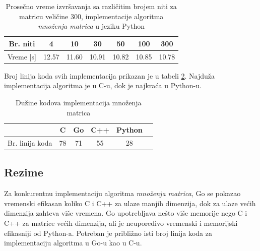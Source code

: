 \documentclass[12pt,oneside]{memoir}
\begin{document}
\begin{table}
\begin{center}
\caption{Prosečno vreme izvršavanja sa različitim brojem niti  za matricu veličine 300, implementacije algoritma \textit{množenja matrica} u jeziku Python}
\begin{tabular}{||c||c|c|c|c|c|c||}
\hline
Br. niti &4 &10 &30 &50 &100 & 300  \\ \hline
Vreme [s]	&12.57	&11.60	&10.91	 & 10.82	&10.85	&10.78\\ \hline
\end{tabular}
\label{tab:matrix111}
\end{center}
\end{table}

Broj linija koda svih  implementacija prikazan je u tabeli \ref{tab:matrix2}. Najduža implementacija algoritma je u C-u, dok je najkraća u Python-u.

\begin{table}
\begin{center}
\caption{Dužine kodova implementacija množenja matrica}
\begin{tabular}{|c|c|c|c|c|c|}
\hline
		&  C 	& Go	& C++	& Python	\\ \hline
Br. linija koda& 78	& 71	&55		&28		\\ \hline
\end{tabular}
\label{tab:matrix2}
\end{center}
\end{table}

\subsection{Rezime}

Za konkurentnu implementaciju algoritma \textit{množenja matrica}, Go se pokazao vremenski efikasan koliko C i C++ za ulaze manjih dimenzija, dok za ulaze većih dimenzija zahteva više vremena. Go upotrebljava nešto više memorije nego C i C++ za matrice većih dimenzija, ali je neuporedivo vremenski i memorijski efikasniji od Python-a. Potreban je približno isti broj linija koda za implementaciju algoritma u Go-u kao u C-u.

\end{document}
